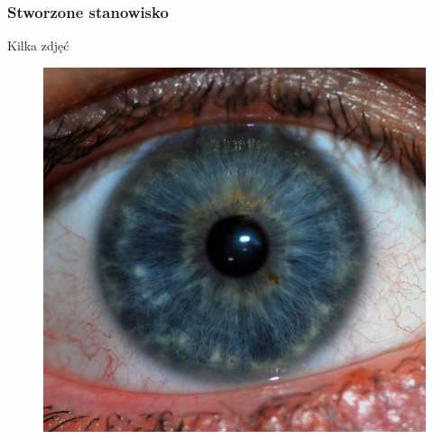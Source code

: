 \documentclass{beamer}
\begin{document}

\begin{frame}
\frametitle{Stworzone stanowisko}
Kilka zdjęć
\begin{figure}
\begin{center}
\includegraphics[scale=0.04]{stanowisko.jpg}
\end{center}
\end{figure}
\end{frame}

\end{document}

